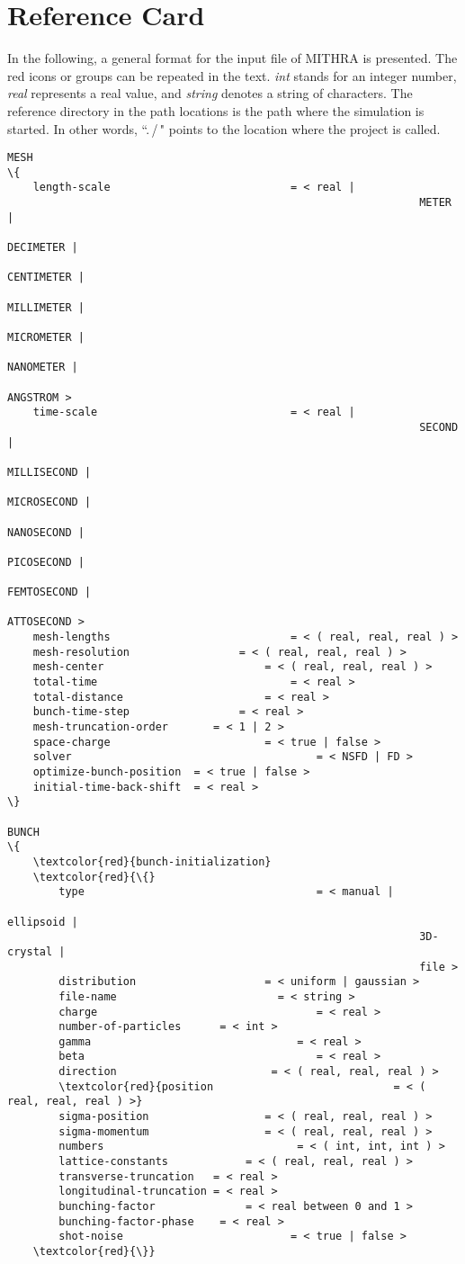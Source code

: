 \chapter{Reference Card}
\label{chapter_refcard}

In the following, a general format for the input file of MITHRA is presented. The red icons or groups can be repeated in the text. \emph{int} stands for an integer number, \emph{real} represents a real value, and \emph{string} denotes a string of characters. The reference directory in the path locations is the path where the simulation is started. In other words, ``.\,/\," points to the location where the project is called.

\begin{multicols}{2}
\setlength{\columnseprule}{0.1pt}

\begin{Verbatim}[fontsize=\footnotesize, tabsize=2, fontfamily=courier,	fontseries=b, commandchars=\\\{\}]
MESH
\{
	length-scale							= < real | 
																METER | 
																DECIMETER | 
																CENTIMETER | 
																MILLIMETER | 
																MICROMETER |
																NANOMETER | 
																ANGSTROM >
	time-scale								= < real | 
																SECOND | 
																MILLISECOND | 
																MICROSECOND | 
																NANOSECOND | 
																PICOSECOND | 
																FEMTOSECOND | 
																ATTOSECOND >
	mesh-lengths							= < ( real, real, real ) >
	mesh-resolution		 			= < ( real, real, real ) >
	mesh-center				 			= < ( real, real, real ) >
	total-time								= < real >
	total-distance						= < real >
	bunch-time-step		 			= < real >
	mesh-truncation-order 		= < 1 | 2 >
	space-charge  						= < true | false >
	solver										= < NSFD | FD >
	optimize-bunch-position	 = < true | false >
	initial-time-back-shift	 = < real >
\}

BUNCH
\{
	\textcolor{red}{bunch-initialization}
	\textcolor{red}{\{}
		type  									= < manual | 
																ellipsoid | 
																3D-crystal | 
																file >
		distribution  					= < uniform | gaussian >
		file-name 						  = < string >
		charge  								= < real >
		number-of-particles  	 = < int >
		gamma  								 = < real >
		beta  									= < real >
		direction  						 = < ( real, real, real ) >
		\textcolor{red}{position  							= < ( real, real, real ) >}
		sigma-position  				= < ( real, real, real ) >
		sigma-momentum  				= < ( real, real, real ) >
		numbers								 = < ( int, int, int ) >
		lattice-constants			 = < ( real, real, real ) >
		transverse-truncation   = < real >
		longitudinal-truncation = < real >
		bunching-factor  			 = < real between 0 and 1 >
		bunching-factor-phase	 = < real >
		shot-noise  						= < true | false >
	\textcolor{red}{\}}


\end{Verbatim}
\end{multicols}
